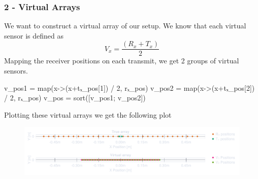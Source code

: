 \documentclass[compress,aspectratio=169]{beamer}
\begin{document}
\begin{frame}[fragile] %
    \frametitle{2 - Virtual Arrays}
    We want to construct a virtual array of our setup.
    We know that each virtual sensor is defined as
    $$
        V_x = \frac{(R_x+T_x)}{2}
    $$
    Mapping the receiver positions on each transmit, we get 2 groups of virtual
    sensors.
    \begin{jllisting}[gobble=8]
        v_pos1 = map(x->(x+tₓ_pos[1]) / 2, rₓ_pos)
        v_pos2 = map(x->(x+tₓ_pos[2]) / 2, rₓ_pos)
        v_pos = sort([v_pos1; v_pos2])
    \end{jllisting}
    Plotting these virtual arrays we get the following plot
    \begin{figure}
        \includegraphics[width=\columnwidth]{"../3.pdf"}
    \end{figure}
\end{frame}
\end{document}
